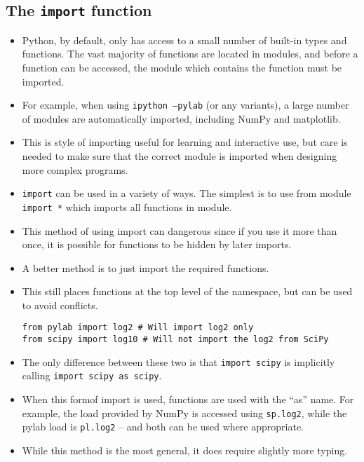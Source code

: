 \documentclass[Pydata.tex]{subfiles}
\begin{document}
\subsection{The \texttt{import} function}
\begin{itemize}
\item Python, by default, only has access to a small number of built-in types and functions. The vast majority of
functions are located in modules, and before a function can be accessed, the module which contains the
function must be imported. 

\item For example, when using \texttt{ipython --pylab} (or any variants), a large number
of modules are automatically imported, including NumPy and matplotlib.
\item This is style of importing useful
for learning and interactive use, but care is needed to make sure that the correct module is imported when
designing more complex programs.

\item \texttt{import} can be used in a variety of ways. The simplest is to use from module \texttt{import *} which imports
all functions in module. 
\item This method of using import can dangerous since if you use it more than once,
it is possible for functions to be hidden by later imports. 
\item A better method is to just import the required
functions. 
\item This still places functions at the top level of the namespace, but can be used to avoid conflicts.
\begin{framed}
\begin{verbatim}
from pylab import log2 # Will import log2 only
from scipy import log10 # Will not import the log2 from SciPy
\end{verbatim}
\end{framed}
\item The only difference between these two is that \texttt{import scipy} is implicitly calling \texttt{import scipy as scipy}.
\item When this formof import is used, functions are used with the “as” name. For example, the load provided
by NumPy is accessed using \texttt{sp.log2}, while the pylab load is \texttt{pl.log2} – and both can be used where appropriate.
\item While this method is the most general, it does require slightly more typing.
\end{itemize}
\end{document}
